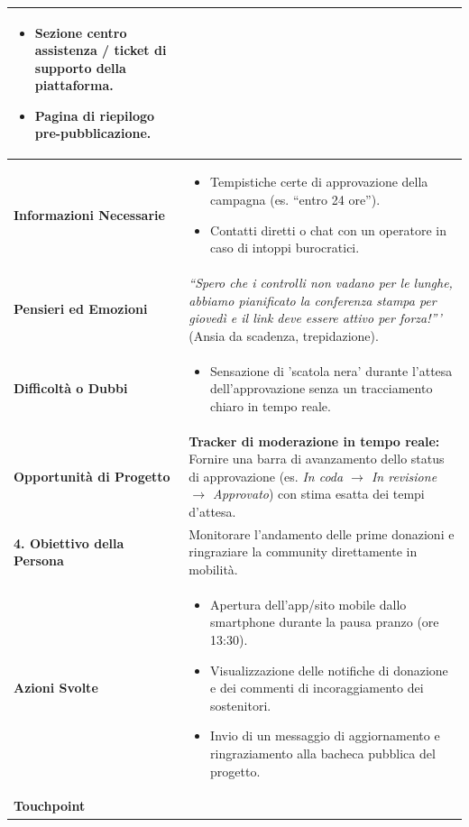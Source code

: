 \documentclass[11pt,a4paper]{article}
\begin{document}
\begin{table}[h!]
\begin{tabular}{|p{3.2cm}|p{11.8cm}|}
\begin{itemize}[leftmargin=*,nosep]
    \item Sezione centro assistenza / ticket di supporto della piattaforma.
    \item Pagina di riepilogo pre-pubblicazione.
\end{itemize} \\ \hline
\textbf{Informazioni Necessarie} &
\begin{itemize}[leftmargin=*,nosep]
    \item Tempistiche certe di approvazione della campagna (es. ``entro 24 ore'').
    \item Contatti diretti o chat con un operatore in caso di intoppi burocratici.
\end{itemize} \\ \hline
\textbf{Pensieri ed Emozioni} &
\textit{``Spero che i controlli non vadano per le lunghe, abbiamo pianificato la conferenza stampa per giovedì e il link deve essere attivo per forza!'''} (Ansia da scadenza, trepidazione). \\ \hline
\textbf{Difficoltà o Dubbi} &
\begin{itemize}[leftmargin=*,nosep]
    \item Sensazione di 'scatola nera' durante l'attesa dell'approvazione senza un tracciamento chiaro in tempo reale.
\end{itemize} \\ \hline
\textbf{Opportunità di Progetto} &
\textbf{Tracker di moderazione in tempo reale:} Fornire una barra di avanzamento dello status di approvazione (es. \textit{In coda $\rightarrow$ In revisione $\rightarrow$ Approvato}) con stima esatta dei tempi d'attesa. \\ \hline
\hline
\textbf{4. Obiettivo della Persona} & Monitorare l'andamento delle prime donazioni e ringraziare la community direttamente in mobilità. \\ \hline
\textbf{Azioni Svolte} &
\begin{itemize}[leftmargin=*,nosep]
    \item Apertura dell'app/sito mobile dallo smartphone durante la pausa pranzo (ore 13:30).
    \item Visualizzazione delle notifiche di donazione e dei commenti di incoraggiamento dei sostenitori.
    \item Invio di un messaggio di aggiornamento e ringraziamento alla bacheca pubblica del progetto.
\end{itemize} \\ \hline
\textbf{Touchpoint} &
\begin{itemize}[leftmargin=*,nosep]

\end{itemize}
\end{tabular}
\end{table}
\end{document}
